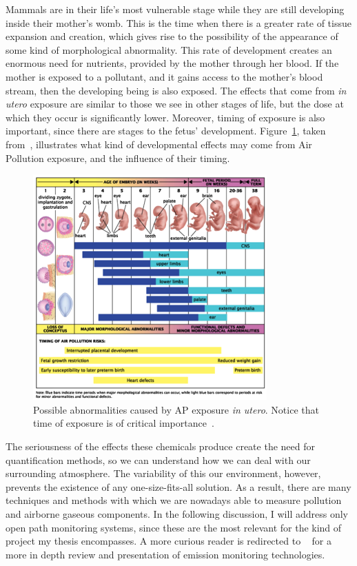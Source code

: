 Mammals are in their life's most vulnerable stage while they are still
developing inside their mother's womb. This is the time when there is a
greater rate of tissue expansion and creation, which gives rise to the
possibility of the appearance of some kind of morphological abnormality.
This rate of development creates an enormous need for nutrients,
provided by the mother through her blood. If the mother is exposed to a
pollutant, and it gains access to the mother's blood stream, then the
developing being is also exposed. The effects that come from \emph{in
utero} exposure are similar to those we see in other stages of life, but
the dose at which they occur is significantly lower. Moreover, timing of
exposure is also important, since there are stages to the fetus'
development. Figure~\ref{fig:AP_in_utero}, taken
from~\cite{Vallero2014}, illustrates what kind of developmental effects
may come from Air Pollution exposure, and the influence of their timing.

\begin{figure}[htpb]
    \centering
    \includegraphics[width=0.8\textwidth]{img/development.png}
    \caption{Possible abnormalities caused by \gls{AP} exposure \emph{in
    utero}. Notice that time of exposure is of critical
    importance~\cite{Vallero2014}.}
    \label{fig:AP_in_utero}
\end{figure}

The seriousness of the effects these chemicals produce create the need
for quantification methods, so we can understand how we can deal with
our surrounding atmosphere. The variability of this our environment,
however, prevents the existence of any one-size-fits-all solution.  As a
result, there are many techniques and methods with which we are nowadays
able to measure pollution and airborne gaseous components. In the
following discussion, I will address only open path monitoring systems,
since these are the most relevant for the kind of project my thesis
encompasses. A more curious reader is redirected to ~\cite{Stewart1996,
Clark1997, Vallero2014} for a more in depth review and presentation of
emission monitoring technologies.

